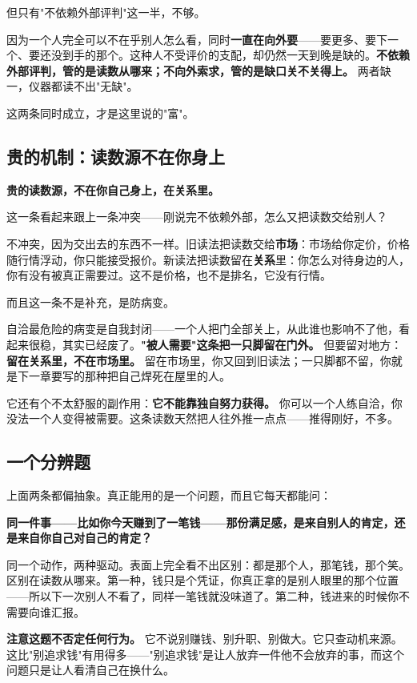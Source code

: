 \documentclass[11pt,a4paper]{ctexart}
\begin{document}
但只有"不依赖外部评判"这一半，不够。

因为一个人完全可以不在乎别人怎么看，同时\textbf{一直在向外要}——要更多、要下一个、要还没到手的那个。这种人不受评价的支配，却仍然一天到晚是缺的。\textbf{不依赖外部评判，管的是读数从哪来；不向外索求，管的是缺口关不关得上。} 两者缺一，仪器都读不出"无缺"。

这两条同时成立，才是这里说的"富"。

\subsection{贵的机制：读数源不在你身上}

\textbf{贵的读数源，不在你自己身上，在关系里。}

这一条看起来跟上一条冲突——刚说完不依赖外部，怎么又把读数交给别人？

不冲突，因为交出去的东西不一样。旧读法把读数交给\textbf{市场}：市场给你定价，价格随行情浮动，你只能接受报价。新读法把读数留在\textbf{关系}里：你怎么对待身边的人，你有没有被真正需要过。这不是价格，也不是排名，它没有行情。

而且这一条不是补充，是防病变。

自洽最危险的病变是自我封闭——一个人把门全部关上，从此谁也影响不了他，看起来很稳，其实已经废了。\textbf{"被人需要"这条把一只脚留在门外。} 但要留对地方：\textbf{留在关系里，不在市场里。} 留在市场里，你又回到旧读法；一只脚都不留，你就是下一章要写的那种把自己焊死在屋里的人。

它还有个不太舒服的副作用：\textbf{它不能靠独自努力获得。} 你可以一个人练自洽，你没法一个人变得被需要。这条读数天然把人往外推一点点——推得刚好，不多。

\subsection{一个分辨题}

上面两条都偏抽象。真正能用的是一个问题，而且它每天都能问：

\textbf{同一件事——比如你今天赚到了一笔钱——那份满足感，是来自别人的肯定，还是来自你自己对自己的肯定？}

同一个动作，两种驱动。表面上完全看不出区别：都是那个人，那笔钱，那个笑。区别在读数从哪来。第一种，钱只是个凭证，你真正拿的是别人眼里的那个位置——所以下一次别人不看了，同样一笔钱就没味道了。第二种，钱进来的时候你不需要向谁汇报。

\textbf{注意这题不否定任何行为。} 它不说别赚钱、别升职、别做大。它只查动机来源。这比"别追求钱"有用得多——"别追求钱"是让人放弃一件他不会放弃的事，而这个问题只是让人看清自己在换什么。
\end{document}
